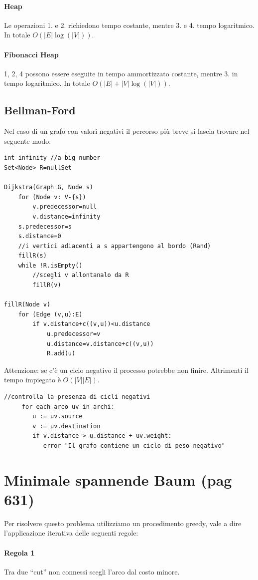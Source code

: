 \documentclass[a4paper]{book}
\newcommand{\lstIndent}{4}
\begin{document}
\paragraph*{Heap}
Le operazioni 1. e 2. richiedono tempo costante, mentre 3. e 4. tempo logaritmico. In totale $O(|E|\log (|V|))$.
\paragraph*{Fibonacci Heap}
1, 2, 4 possono essere eseguite in tempo ammortizzato costante, mentre 3. in tempo logaritmico. In totale $O(|E|+|V|\log (|V|))$.
\subsection*{Bellman-Ford}
Nel caso di un grafo con valori negativi il percorso più breve si lascia trovare nel seguente modo:
\begin{lstlisting}[tabsize=\lstIndent]
int infinity //a big number
Set<Node> R=nullSet
	
Dijkstra(Graph G, Node s)
	for (Node v: V-{s})
		v.predecessor=null
		v.distance=infinity
	s.predecessor=s
	s.distance=0
	//i vertici adiacenti a s appartengono al bordo (Rand)
	fillR(s)
	while !R.isEmpty()
		//scegli v allontanalo da R
		fillR(v)
		
fillR(Node v)
	for (Edge (v,u):E)
		if v.distance+c((v,u))<u.distance
			u.predecessor=v
			u.distance=v.distance+c((v,u))
			R.add(u)				
\end{lstlisting}
Attenzione: se c'è un ciclo negativo il processo potrebbe non finire. Altrimenti il tempo impiegato è $O(|V||E|)$.
\begin{lstlisting}[tabsize=\lstIndent]
     //controlla la presenza di cicli negativi
     for each arco uv in archi:
        u := uv.source
        v := uv.destination
        if v.distance > u.distance + uv.weight:
           error "Il grafo contiene un ciclo di peso negativo"
\end{lstlisting}
\section{Minimale spannende Baum (pag 631)}
Per risolvere questo problema utilizziamo un procedimento greedy, vale a dire l'applicazione iterativa delle seguenti regole:
\paragraph*{Regola 1} Tra due ``cut'' non connessi scegli l'arco dal costo minore.
\end{document}
